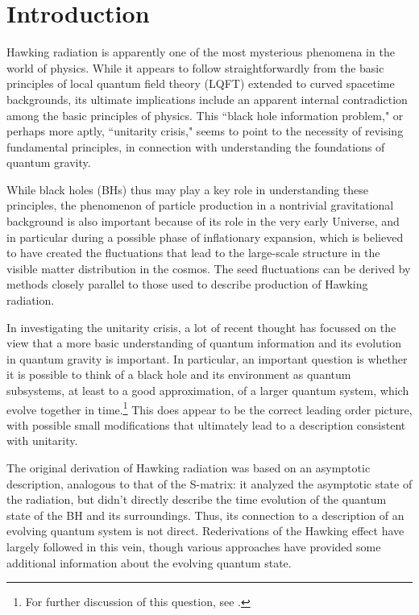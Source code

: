 \documentclass[11pt]{article}
\numberwithin{equation}{section}
\begin{document}
\begin{titlepage}
\begin{abstract}
 

 \medskip
  \noindent
  \end{abstract}
\bigskip \bigskip \bigskip 

  \end{titlepage}




\section{Introduction}

Hawking radiation\cite{Hawk} is apparently one of the most mysterious phenomena in the world of physics.  While it appears to follow straightforwardly from the basic principles of local quantum field theory (LQFT) extended to curved spacetime backgrounds, its ultimate implications include an apparent internal contradiction among the basic principles of physics.  This ``black hole information problem," or perhaps more aptly, ``unitarity crisis," seems to point to the necessity of revising fundamental principles, in connection with understanding the foundations of quantum gravity.

While black holes (BHs) thus may play a key role in understanding these principles, the phenomenon of particle production in a nontrivial gravitational background is also important because of its role in the very early Universe, and in particular during a possible phase of inflationary expansion, which is believed to have created the fluctuations that lead to the large-scale structure in the visible matter distribution in the cosmos.  The seed fluctuations can be derived by methods closely parallel to those used to describe production of Hawking radiation.

In investigating the unitarity crisis, a lot of recent thought has focussed on the view that a more basic understanding of quantum information and its evolution in quantum gravity is important.  In particular, an important question is whether it is possible to think of a black hole and its environment as quantum subsystems, at least to a good approximation, of a larger quantum system, which evolve together in time.\footnote{For further discussion of this question, see \cite{SGsub}.}
This does appear to be the correct leading order picture, with possible small modifications that ultimately lead to a description consistent with unitarity.  

The original derivation\cite{Hawk} of Hawking radiation was based on an asymptotic description, analogous to that of the S-matrix:  it analyzed the asymptotic state of the radiation, but didn't directly describe the time evolution of the quantum state of the BH and its surroundings.  Thus, its connection to a description of an evolving quantum system is not direct.
Rederivations of the Hawking effect have largely followed in this vein, though various approaches have provided some additional information about the evolving quantum state.
\end{document}
